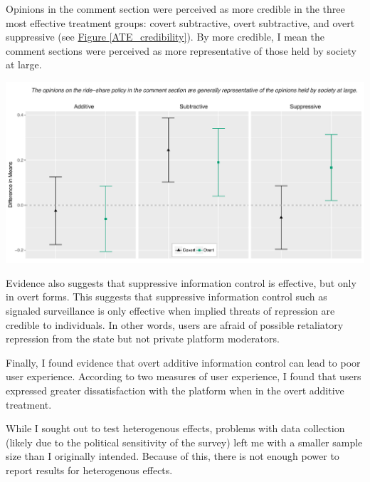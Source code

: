 \documentclass[11pt]{article}
\begin{document}
Opinions in the comment section were perceived as more credible in the three most effective treatment groups: covert subtractive, overt subtractive, and overt suppressive  (see \hyperref[ATE_credibility]{Figure \ref*{ATE_credibility}}). By more credible, I mean the comment sections were perceived as more representative of those held by society at large.

\begin{minipage}{\linewidth}
    \vspace{1em}
    \begin{center}
        \includegraphics[width=.9\textwidth]{figures/ATE_credibility.pdf}\\
        \label{ATE_credibility}
    \end{center}
    \vspace{1em}
\end{minipage}

Evidence also suggests that suppressive information control is effective, but only in overt forms. This suggests that suppressive information control such as signaled surveillance is only effective when implied threats of repression are credible to individuals. In other words, users are afraid of possible retaliatory repression from the state but not private platform moderators.

Finally, I found evidence that overt additive information control can lead to poor user experience. According to two measures of user experience, I found that users expressed greater dissatisfaction with the platform when in the overt additive treatment.

While I sought out to test heterogenous effects, problems with data collection (likely due to the political sensitivity of the survey) left me with a smaller sample size than I originally intended. Because of this, there is not enough power to report results for heterogenous effects.
\end{document}
